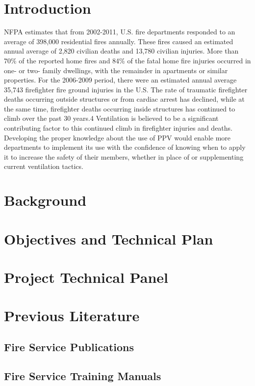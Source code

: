 \documentclass{article}
\begin{document}
\section*{Introduction}
NFPA estimates that from 2002-2011, U.S. fire departments responded to an average of 398,000 residential fires annually. \cite{NFFF} These fires caused an estimated annual average of 2,820 civilian deaths and 13,780 civilian injuries. More than 70\% of the reported home fires and 84\% of the fatal home fire injuries occurred in one- or two- family dwellings, with the remainder in apartments or similar properties. For the 2006-2009 period, there were an estimated annual average 35,743 firefighter fire ground injuries in the U.S. The rate of traumatic firefighter deaths occurring outside structures or from cardiac arrest has declined, while at the same time, firefighter deaths occurring inside structures has continued to climb over the past 30 years.4 Ventilation is believed to be a significant contributing factor to this continued climb in firefighter injuries and deaths.  Developing the proper knowledge about the use of PPV would enable more departments to implement its use with the confidence of knowing when to apply it to increase the safety of their members, whether in place of or supplementing current ventilation tactics.

\section{Background}

\section{Objectives and Technical Plan}

\section{Project Technical Panel}

\section{Previous Literature}
\subsection{Fire Service Publications}
\subsection{Fire Service Training Manuals}
\end{document}
